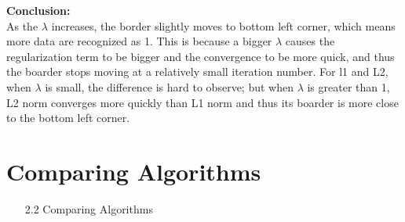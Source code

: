 \documentclass{article}
\begin{document}
	\newpage
	\noindent
	\textbf{Conclusion: }\\
	As the $\lambda$ increases, the border slightly moves to bottom left corner, which means more data are recognized as 1. This is because a bigger $\lambda$ causes the regularization term to be bigger and the convergence to be more quick, and thus the boarder stops moving at a relatively small iteration number. For l1 and L2, when $\lambda$ is small, the difference is hard to observe; but when $\lambda$ is greater than 1, L2 norm converges more quickly than L1 norm and thus its boarder is more close to the bottom left corner.
	
	
	
	
    \section{Comparing Algorithms} 
    	\begin{enumerate}
    	\item [2.2]Comparing Algorithms
    	
    	
    	\end{enumerate}
        
        
        
\end{document}
